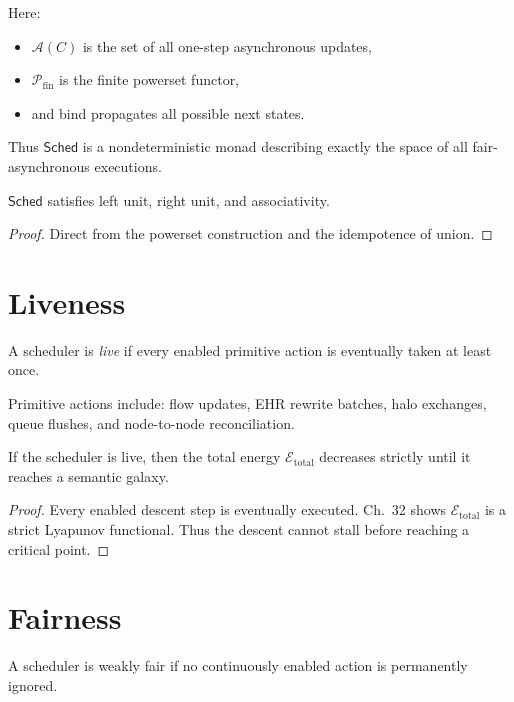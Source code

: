 Here:
\begin{itemize}
\item $\mathcal{A}(C)$ is the set of all one-step asynchronous updates,
\item $\mathcal{P}_{\mathrm{fin}}$ is the finite powerset functor,
\item and bind propagates all possible next states.
\end{itemize}

Thus $\mathsf{Sched}$ is a nondeterministic monad describing exactly the
space of all fair-asynchronous executions.

\begin{lemma}
$\mathsf{Sched}$ satisfies left unit, right unit, and associativity.
\end{lemma}

\begin{proof}
Direct from the powerset construction and the idempotence of union.
\end{proof}


\section{Liveness}

\begin{definition}[Liveness]
A scheduler is \emph{live} if every enabled primitive action is eventually
taken at least once.
\end{definition}

Primitive actions include:
flow updates, EHR rewrite batches, halo exchanges, queue flushes,
and node-to-node reconciliation.

\begin{theorem}
If the scheduler is live, then the total energy
$\mathcal{E}_{\mathrm{total}}$ decreases strictly until it reaches
a semantic galaxy.
\end{theorem}

\begin{proof}
Every enabled descent step is eventually executed.
Ch.~32 shows $\mathcal{E}_{\mathrm{total}}$ is a strict Lyapunov functional.
Thus the descent cannot stall before reaching a critical point.
\end{proof}


\section{Fairness}

\begin{definition}
A scheduler is weakly fair if no continuously enabled action is
permanently ignored.

\end{definition}

